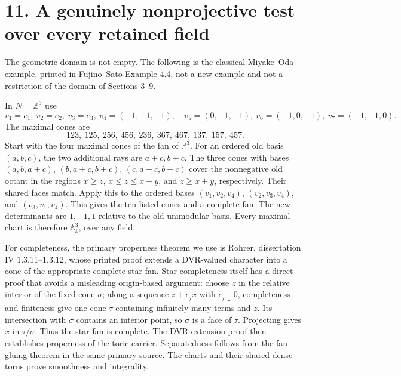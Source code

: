 \documentclass[
  10pt,
]{article}
\begin{document}
\section{11. A genuinely nonprojective test over every retained
field}\label{a-genuinely-nonprojective-test-over-every-retained-field}

The geometric domain is not empty. The following is the classical
Miyake--Oda example, printed in Fujino--Sato Example 4.4, not a new
example and not a restriction of the domain of Sections 3--9.

In \(N=\mathbb Z^3\) use \[
v_1=e_1,\ v_2=e_2,\ v_3=e_3,\ v_4=(-1,-1,-1),\quad
v_5=(0,-1,-1),\ v_6=(-1,0,-1),\ v_7=(-1,-1,0).
\] The maximal cones are
\[123,\ 125,\ 256,\ 456,\ 236,\ 367,\ 467,\ 137,\ 157,\ 457.\] Start
with the four maximal cones of the fan of \(\mathbb P^3\). For an
ordered old basis \((a,b,c)\), the two additional rays are \(a+c,b+c\).
The three cones with bases \((a,b,a+c)\), \((b,a+c,b+c)\),
\((c,a+c,b+c)\) cover the nonnegative old octant in the regions
\(x\geq z\), \(x\leq z\leq x+y\), and \(z\geq x+y\), respectively. Their
shared faces match. Apply this to the ordered bases \((v_1,v_2,v_4)\),
\((v_2,v_3,v_4)\), and \((v_3,v_1,v_4)\). This gives the ten listed
cones and a complete fan. The new determinants are \(1,-1,1\) relative
to the old unimodular basis. Every maximal chart is therefore
\(\mathbb A^3_k\), over any field.

For completeness, the primary properness theorem we use is Rohrer,
dissertation IV 1.3.11--1.3.12, whose printed proof extends a DVR-valued
character into a cone of the appropriate complete star fan. Star
completeness itself has a direct proof that avoids a misleading
origin-based argument: choose \(z\) in the relative interior of the
fixed cone \(\sigma\); along a sequence \(z+\epsilon_j x\) with
\(\epsilon_j\downarrow0\), completeness and finiteness give one cone
\(\tau\) containing infinitely many terms and \(z\). Its intersection
with \(\sigma\) contains an interior point, so \(\sigma\) is a face of
\(\tau\). Projecting gives \(x\) in \(\tau/\sigma\). Thus the star fan
is complete. The DVR extension proof then establishes properness of the
toric carrier. Separatedness follows from the fan gluing theorem in the
same primary source. The charts and their shared dense torus prove
smoothness and integrality.
\end{document}
